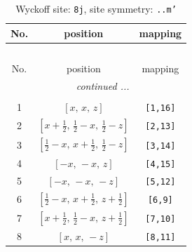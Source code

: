 \documentclass[fleqn,8pt]{jsarticle}
\begin{document}
\begin{longtable}{ccc}
\caption{Wyckoff site: {\tt 8j}, site symmetry: {\tt ..m'}}
 \\
 \hline \hline
No. & position & mapping \\ \hline \endfirsthead

\multicolumn{2}{l}{\tablename\ \thetable{}} \\
 \hline \hline
No. & position & mapping \\ \hline \endhead

 \hline \hline
\multicolumn{2}{r}{\footnotesize\it continued ...} \\ \endfoot

 \hline \hline
\multicolumn{2}{r}{} \\ \endlastfoot

1 & $\left[ x,\, x,\, z \right]$ & {\tt [1,16]} \\ \hline
2 & $\left[ x + \frac{1}{2},\, \frac{1}{2} - x,\, \frac{1}{2} - z \right]$ & {\tt [2,13]} \\ \hline
3 & $\left[ \frac{1}{2} - x,\, x + \frac{1}{2},\, \frac{1}{2} - z \right]$ & {\tt [3,14]} \\ \hline
4 & $\left[ - x,\, - x,\, z \right]$ & {\tt [4,15]} \\ \hline
5 & $\left[ - x,\, - x,\, - z \right]$ & {\tt [5,12]} \\ \hline
6 & $\left[ \frac{1}{2} - x,\, x + \frac{1}{2},\, z + \frac{1}{2} \right]$ & {\tt [6,9]} \\ \hline
7 & $\left[ x + \frac{1}{2},\, \frac{1}{2} - x,\, z + \frac{1}{2} \right]$ & {\tt [7,10]} \\ \hline
8 & $\left[ x,\, x,\, - z \right]$ & {\tt [8,11]} \\
\end{longtable}
\renewcommand{\arraystretch}{1.2}
\end{document}
